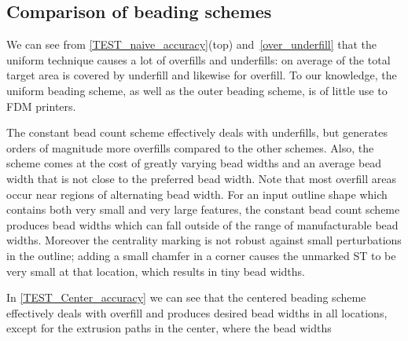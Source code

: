 

\subsection{Comparison of beading schemes}
We can see from \cref{TEST_naive_accuracy}(top) and~\ref{over_underfill} that the uniform technique causes a lot of overfills and underfills: on average   of the total target area is covered by underfill and likewise for overfill.
To our knowledge, the uniform beading scheme, as well as the outer beading scheme, is of little use to FDM printers.

The constant bead count scheme effectively deals with underfills, but generates orders of magnitude more overfills compared to the other schemes. 
Also, the scheme comes at the cost of greatly varying bead widths and an average bead width that is not close to the preferred bead width.
Note that most overfill areas occur near regions of alternating bead width. 
For an input outline shape which contains both very small and very large features, the constant bead count scheme produces bead widths which can fall outside of the range of manufacturable bead widths.
Moreover the centrality marking is not robust against small perturbations in the outline; adding a small chamfer in a corner causes the unmarked ST to be very small at that location, which results in tiny bead widths.

In \cref{TEST_Center_accuracy} we can see that
the centered beading scheme effectively deals with overfill and produces desired bead widths in all locations, except for the extrusion paths in the center, where the bead widths 

